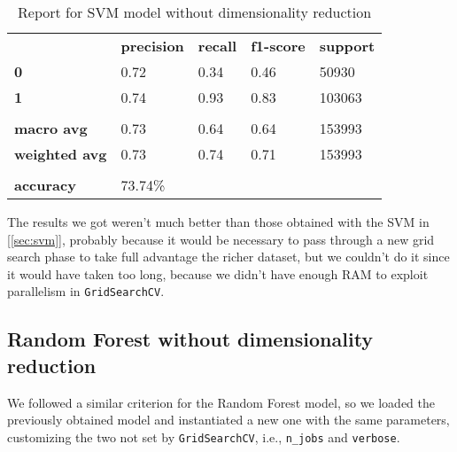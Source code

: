 \begin{table}[h!]
    \centering
    \begin{tabular}{lllll}
        \rowcolor[HTML]{EEEEEE} 
        \cellcolor[HTML]{FBFBFB} & \textbf{precision} & \textbf{recall} & \textbf{f1-score} & \textbf{support} \\
        \rowcolor[HTML]{EEEEEE} 
        \textbf{0}               & 0.72               & 0.34            & 0.46              & 50930            \\
        \rowcolor[HTML]{EEEEEE} 
        \textbf{1}               & 0.74               & 0.93            & 0.83              & 103063           \\
        \rowcolor[HTML]{FBFBFB} 
        &                    &                 &                   &                  \\
        \rowcolor[HTML]{EEEEEE} 
        \textbf{macro avg}       & 0.73               & 0.64            & 0.64              & 153993           \\
        \rowcolor[HTML]{EEEEEE} 
        \textbf{weighted avg}    & 0.73               & 0.74            & 0.71              & 153993           \\
        \rowcolor[HTML]{FBFBFB} 
        &                    &                 &                   &                  \\
        \rowcolor[HTML]{EEEEEE} 
        \textbf{accuracy}        & \multicolumn{4}{l}{\cellcolor[HTML]{EEEEEE}73.74\%}                         
    \end{tabular}
    \caption{Report for SVM model without dimensionality reduction}
    \label{tab:svm-res-no-dim-red}
\end{table}

The results we got weren't much better than those obtained with the SVM in [\ref{sec:svm}], probably because it would be necessary to pass through a new grid search phase to take full advantage the richer dataset, but we couldn't do it since it would have taken too long, because we didn't have enough RAM to exploit parallelism in \texttt{GridSearchCV}.


\newpage
\subsection{Random Forest without dimensionality reduction} \label{sec:rf-no-dim-red}

We followed a similar criterion for the Random Forest model, so we loaded the previously obtained model and instantiated a new one with the same parameters, customizing the two not set by \texttt{GridSearchCV}, i.e., \texttt{n\_jobs} and \texttt{verbose}.

